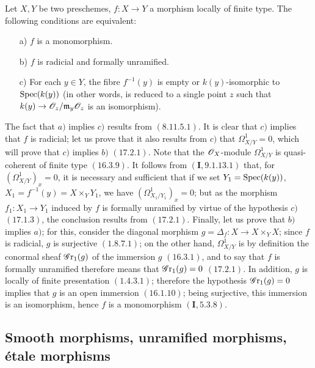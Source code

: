 \begin{proposition}[17.2.6]
\label{IV.17.2.6}
Let $X, Y$ be two preschemes, $f: X \to Y$ a morphism locally of finite type. The following conditions are equivalent:
\begin{enumerate}
\item[a)] $f$ is a monomorphism.
\item[b)] $f$ is radicial and formally unramified.
\item[c)] For each $y \in Y$, the fibre $f^{-1}(y)$ is empty or $k(y)$-isomorphic to ${\mathop{\mathrm{Spec}}\nolimits}(k(y))$ (in other words, is reduced to a single point $z$ such that $k(y) \to \sh{O}_z/\mathfrak{m}_y\sh{O}_z$ is an isomorphism).
\end{enumerate}
\end{proposition}
The fact that $a)$ implies $c)$ results from $(\hyperref[IV.8.11.5.1]{8.11.5.1})$. It is clear that $c)$ implies that $f$ is radicial; let us prove that it also results from $c)$ that $\Omega^1 _{X/Y} = 0$, which will prove that $c)$ implies $b)$ $(\hyperref[IV.17.2.1]{17.2.1})$. Note that the $\mathscr{O}_X$-module $\Omega^1 _{X/Y}$ is quasi-coherent of finite type $(\hyperref[IV.16.3.9]{16.3.9})$. It follows from $(\textbf{I}, \hyperref[I.9.1.13.1]{9.1.13.1})$ that, for $(\Omega^1 _{X/Y})_x = 0$, it is necessary and sufficient that if we set $Y_1 = {\mathop{\mathrm{Spec}}\nolimits}(k(y))$, $X_1 = f^{-1}(y) = X \times_{Y} Y_1$, we have $(\Omega^1 _{X_1/Y_1})_x = 0$; but as the morphism $f_1 : X_1 \to Y_1$ induced by $f$ is formally unramified by virtue of the hypothesis $c)$ $(\hyperref[IV.17.1.3]{17.1.3})$, the conclusion results from $(\hyperref[17.2.1]{17.2.1})$. Finally, let us prove that $b)$ implies $a)$; for this, consider the diagonal morphism $g = \Delta_f : X \to X \times_{Y} X$; since $f$ is radicial, $g$ is surjective $(\hyperref[IV.1.8.7.1]{1.8.7.1})$; on the other hand, $\Omega^1 _{X/Y}$ is by definition the conormal sheaf $\operatorname{\mathscr{G}r_1}(g)$ %
of the immersion $g$ $(\hyperref[IV.16.3.1]{16.3.1})$, and to say that $f$ is formally unramified therefore means that $\operatorname{\mathscr{G}r_1}(g) = 0$ $(\hyperref[IV.17.2.1]{17.2.1})$. In addition, $g$ is locally of finite presentation $(\hyperref[IV.1.4.3.1]{1.4.3.1})$; therefore the hypothesis $\operatorname{\mathscr{G}r_1}(g) = 0$ implies that $g$ is an open immersion $(\hyperref[IV.16.1.10]{16.1.10})$; being surjective, this immersion is an isomorphism, hence $f$ is a monomorphism $(\textbf{I}, \hyperref[I.5.3.8]{5.3.8})$.

\subsection{Smooth morphisms, unramified morphisms, \'etale morphisms}
\label{subsection:IV.17.3}

